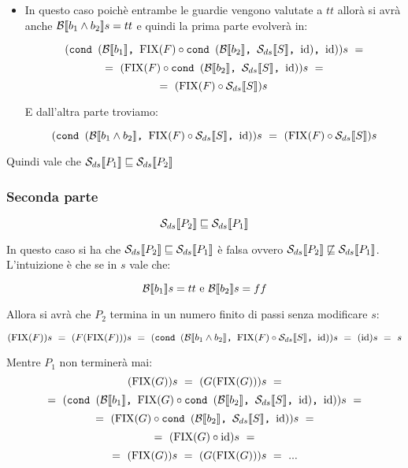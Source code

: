 {\begin{itemize}
        \[ (\cond{b_1}{\fixp{F} \circ \cond{b_2}{\Sds}{\idDS}}{\idDS})s~= \]
       \[  =~(\fixp{F} \circ \cond{b_2}{\Sds}{\idDS})s~= \]
       \[  =~(\fixp{F} \circ \idDS)s~=~(\fixp{F})s~=~(F(\fixp{F}))s~= \]
       \[  =~(\cond{b_1\and{}b_2}{\fixp{F} \circ \Sds}{\idDS})s~=~(\idDS)s~=~s \]
       
        E quindi dall'altra parte similmente avremo:
       
        \[ (\cond{b_1\and{}b_2}{\fixp{F} \circ \Sds}{\idDS})s~=~(\idDS)s~=~s \]
   
        \item {} 
        
        In questo
        caso poichè entrambe le guardie vengono valutate a $tt$ allorà si avrà
        anche $\evalBbs{b_1\and{}b_2}{s}=tt$ e quindi la prima parte evolverà
        in:
        
        \[ (\cond{b_1}{\fixp{F} \circ \cond{b_2}{\Sds}{\idDS}}{\idDS})s~= \]
       \[  =~(\fixp{F} \circ \cond{b_2}{\Sds}{\idDS})s~= \]
        \[ =~(\fixp{F} \circ \Sds)s \]
       
        E dall'altra parte troviamo:
       
        \[ (\cond{b_1\and{}b_2}{\fixp{F} \circ \Sds}{\idDS})s~
        =~(\fixp{F} \circ \Sds)s \]
    
    \end{itemize}
    Quindi vale che $\dsCtxt{P_1} \mineq \dsCtxt{P_2}$

    \subsubsection{Seconda parte} 
    \[ \dsCtxt{P_2}  \mineq \dsCtxt{P_1} \]
    
    In questo caso si ha che $\dsCtxt{P_2} \mineq \dsCtxt{P_1}$ è falsa ovvero
    $\dsCtxt{P_2} \notmineq \dsCtxt{P_1}$. \\
    L'intuizione è che se in $s$ vale che:

    \[ \evalBbs{b_1}{s}=tt $ e $ \evalBbs{b_2}{s}=ff \]
   
    Allora si avrà che $P_2$ termina in un numero finito di passi senza
    modificare $s$:
    
    \[ (\fixp{F})s~=~(F(\fixp{F}))s~=~
    (\cond{b_1\and{}b_2}{\fixp{F} \circ \Sds}{\idDS})s~=~(\idDS)s~=~s \]
    
    Mentre $P_1$ non terminerà mai:
    \[ (\fixp{G})s~=~(G(\fixp{G}))s~= \]
    \[ =~(\cond{b_1}{\fixp{G} \circ \cond{b_2}{\Sds}{\idDS}}{\idDS})s~= \]
    \[ =~(\fixp{G} \circ \cond{b_2}{\Sds}{\idDS})s~= \]
    \[ =~(\fixp{G} \circ \idDS)s~= \]
    \[ =~ (\fixp{G})s~=~(G(\fixp{G}))s~=~... \]

}
